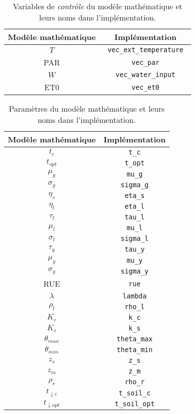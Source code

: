 \begin{table}[H]
  \centering
  \begin{tabular}{|c|c|}
    \hline
    \textbf{Modèle mathématique} & \textbf{Implémentation} \\
    \hline
    $T$ & \lstinline| vec_ext_temperature | \\
    PAR & \lstinline| vec_par | \\
    $W$ & \lstinline| vec_water_input | \\
    ET0 & \lstinline| vec_et0 | \\
    \hline
    \end{tabular}
  \caption{Variables de \emph{contrôle} du modèle mathématique et leurs noms
  dans l'implémentation.}
  \label{table:control_var}
\end{table}

\begin{table}[H]
  \centering
  \begin{tabular}{|c|c|}
    \hline
    \textbf{Modèle mathématique} & \textbf{Implémentation} \\
    \hline
    $t_c$ & \lstinline| t_c | \\
    $t_{opt}$ & \lstinline| t_opt | \\
    $\mu_g$ & \lstinline| mu_g | \\
    $\sigma_g$ & \lstinline| sigma_g | \\
    $\eta_s$ & \lstinline| eta_s | \\
    $\eta_l$ & \lstinline| eta_l | \\
    $\tau_l$ & \lstinline| tau_l | \\
    $\mu_l$ & \lstinline| mu_l | \\
    $\sigma_l$ & \lstinline| sigma_l | \\
    $\tau_y$ & \lstinline| tau_y | \\
    $\mu_y$ & \lstinline| mu_y | \\
    $\sigma_y$ & \lstinline| sigma_y | \\
    RUE & \lstinline| rue | \\
    $\lambda$ & \lstinline| lambda | \\
    $\rho_l$ & \lstinline| rho_l | \\
    $K_c$ & \lstinline| k_c | \\
    $K_s$ & \lstinline| k_s | \\
    $\theta_{max}$ & \lstinline| theta_max | \\
    $\theta_{min}$ & \lstinline| theta_min | \\
    $z_s$ & \lstinline| z_s | \\
    $z_m$ & \lstinline| z_m | \\
    $\rho_r$ & \lstinline| rho_r | \\
    $t_{\downarrow c}$ & \lstinline| t_soil_c | \\
    $t_{\downarrow opt}$ & \lstinline| t_soil_opt | \\
    \hline
  \end{tabular}
  \caption{Paramètres du modèle mathématique et leurs noms
  dans l'implémentation.}
  \label{table:param_var}
\end{table}
  




